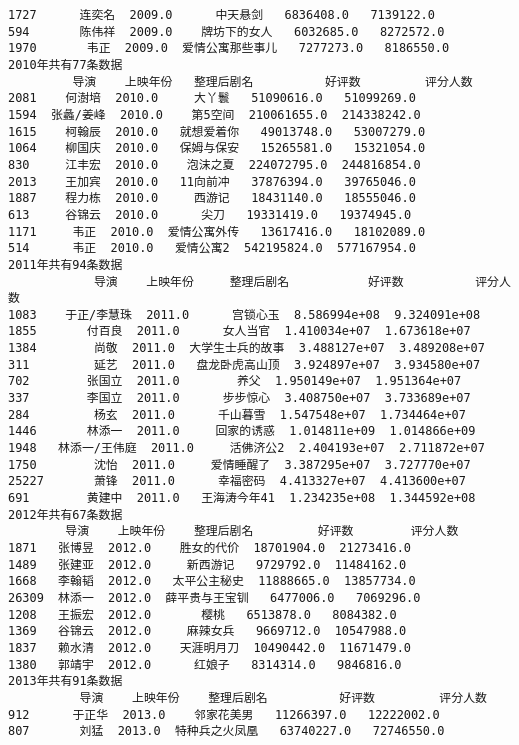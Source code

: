 \documentclass[11pt]{article}
\begin{document}
\begin{Verbatim}[commandchars=\\\{\}]
1727      连奕名  2009.0      中天悬剑   6836408.0   7139122.0
594       陈伟祥  2009.0    牌坊下的女人   6032685.0   8272572.0
1970       韦正  2009.0  爱情公寓那些事儿   7277273.0   8186550.0
2010年共有77条数据
         导演    上映年份   整理后剧名          好评数         评分人数
2081    何澍培  2010.0     大丫鬟   51090616.0   51099269.0
1594  张蠡/姜峰  2010.0    第5空间  210061655.0  214338242.0
1615    柯翰辰  2010.0   就想爱着你   49013748.0   53007279.0
1064    柳国庆  2010.0   保姆与保安   15265581.0   15321054.0
830     江丰宏  2010.0    泡沫之夏  224072795.0  244816854.0
2013    王加宾  2010.0   11向前冲   37876394.0   39765046.0
1887    程力栋  2010.0     西游记   18431140.0   18555046.0
613     谷锦云  2010.0      尖刀   19331419.0   19374945.0
1171     韦正  2010.0  爱情公寓外传   13617416.0   18102089.0
514      韦正  2010.0   爱情公寓2  542195824.0  577167954.0
2011年共有94条数据
            导演    上映年份     整理后剧名           好评数          评分人数
1083    于正/李慧珠  2011.0      宫锁心玉  8.586994e+08  9.324091e+08
1855       付百良  2011.0      女人当官  1.410034e+07  1.673618e+07
1384        尚敬  2011.0  大学生士兵的故事  3.488127e+07  3.489208e+07
311         延艺  2011.0   盘龙卧虎高山顶  3.924897e+07  3.934580e+07
702        张国立  2011.0        养父  1.950149e+07  1.951364e+07
337        李国立  2011.0      步步惊心  3.408750e+07  3.733689e+07
284         杨玄  2011.0      千山暮雪  1.547548e+07  1.734464e+07
1446       林添一  2011.0     回家的诱惑  1.014811e+09  1.014866e+09
1948   林添一/王伟庭  2011.0     活佛济公2  2.404193e+07  2.711872e+07
1750        沈怡  2011.0     爱情睡醒了  3.387295e+07  3.727770e+07
25227       萧锋  2011.0      幸福密码  4.413327e+07  4.413600e+07
691        黄建中  2011.0   王海涛今年41  1.234235e+08  1.344592e+08
2012年共有67条数据
        导演    上映年份    整理后剧名         好评数        评分人数
1871   张博昱  2012.0    胜女的代价  18701904.0  21273416.0
1489   张建亚  2012.0     新西游记   9729792.0  11484162.0
1668   李翰韬  2012.0   太平公主秘史  11888665.0  13857734.0
26309  林添一  2012.0  薛平贵与王宝钏   6477006.0   7069296.0
1208   王振宏  2012.0       樱桃   6513878.0   8084382.0
1369   谷锦云  2012.0     麻辣女兵   9669712.0  10547988.0
1837   赖水清  2012.0    天涯明月刀  10490442.0  11671479.0
1380   郭靖宇  2012.0      红娘子   8314314.0   9846816.0
2013年共有91条数据
          导演    上映年份    整理后剧名          好评数         评分人数
912      于正华  2013.0    邻家花美男   11266397.0   12222002.0
807       刘猛  2013.0  特种兵之火凤凰   63740227.0   72746550.0

\end{Verbatim}
\end{document}
